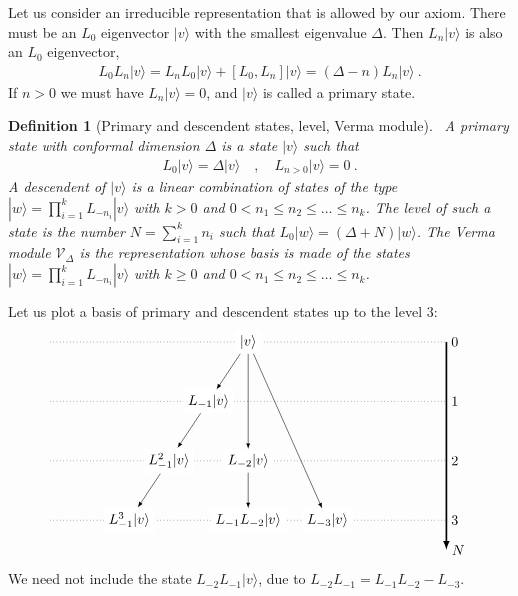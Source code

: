 \documentclass[12pt, a4paper]{article}
\theoremstyle{break}
\newtheorem{defn}[exo]{Definition}
\begin{document}
Let us consider an irreducible representation that is allowed by our axiom. There must be an $L_0$ eigenvector $|v\rangle$ with the smallest eigenvalue $\Delta$. Then $L_n|v\rangle$ is also an $L_0$ eigenvector,
\begin{align}
 L_0 L_n|v\rangle = L_nL_0|v\rangle + [L_0, L_n] |v\rangle  = (\Delta-n)L_n|v\rangle \ .
\end{align}
If $n>0$ we must have $L_n|v\rangle =0$, and $|v\rangle $ is called a primary state.

\begin{defn}[Primary and descendent states, level, Verma module]
 ~\label{def:prim}
 A primary state with conformal dimension $\Delta$ is a state $|v\rangle$ such that 
 \begin{align}
  L_0 |v\rangle = \Delta |v\rangle \quad , \quad L_{n>0} |v\rangle = 0\ .
 \end{align}
A descendent of $|v\rangle$ is a linear combination of states of the type $|w\rangle = \prod_{i=1}^k L_{-n_i} |v\rangle$ with $k>0$ and $0<n_1\leq n_2 \leq \dots \leq n_k$. 
The level of such a state is the number $N=\sum_{i=1}^k n_i$ such that $L_0|w\rangle = (\Delta + N)|w\rangle$. The Verma module $\mathcal V_\Delta$ is the representation whose basis is made of the states $|w\rangle = \prod_{i=1}^k L_{-n_i} |v\rangle$ with $k\geq 0$ and $0<n_1\leq n_2 \leq \dots \leq n_k$.
\end{defn}
Let us plot a basis of primary and descendent states up to the level $3$:
\begin{align}
 \begin{tikzpicture}[scale = .25, baseline=(current  bounding  box.center)]
  \draw[-latex, very thick] (20, 0) -- (20, -21) node [right] {$N$};
  \foreach \x in {0, ..., 3}
  {
  \draw [dotted] (-20, {-6*\x}) -- (20, {-6*\x}) node [right] {${\x}$};
  }
  \node[fill = white] at (0, 0) (0) {$|v\rangle$};
  \node[fill = white] at (-4,-6) (1) {$L_{-1}|v\rangle$};
  \node[fill = white] at (-8, -12) (11) {$L_{-1}^2|v\rangle$};
  \node[fill = white] at (-12, -18) (111) {$L_{-1}^3|v\rangle$};
  \node[fill = white] at (0,-12) (2) {$L_{-2}|v\rangle$};
  \node[fill = white] at (0,-18) (12) {$L_{-1}L_{-2}|v\rangle$};
  \node[fill = white] at (8,-18) (3) {$L_{-3}|v\rangle$};
  \draw[-latex] (0) -- (1);
  \draw[-latex] (1) -- (11);
  \draw[-latex] (11) -- (111);
  \draw[-latex] (0) -- (2);
  \draw[-latex] (0) -- (3);
  \draw[-latex] (2) -- (12);
 \end{tikzpicture}
\end{align}
We need not include the state $L_{-2}L_{-1}|v\rangle$, due to $L_{-2}L_{-1} = L_{-1}L_{-2} - L_{-3}$.
\end{document}
